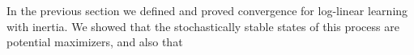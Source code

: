 In the previous section we defined and proved convergence for log-linear learning with inertia. We showed that the stochastically stable states of this process are potential maximizers, and also that 








